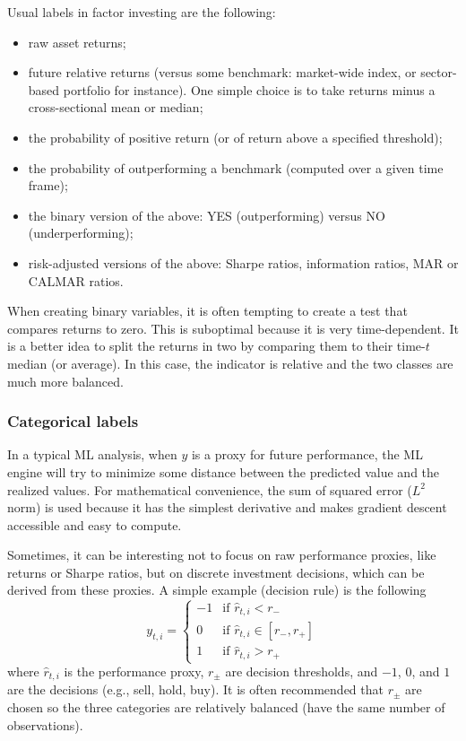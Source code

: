 Usual labels in factor investing are the following:
\begin{itemize}
    \item raw asset returns;
    \item future relative returns (versus some benchmark: market-wide index, or sector-based portfolio for instance). One simple choice is to take returns minus a cross-sectional mean or median;
    \item the probability of positive return (or of return above a specified threshold);
    \item the probability of outperforming a benchmark (computed over a given time frame);
    \item the binary version of the above: YES (outperforming) versus NO (underperforming);
    \item risk-adjusted versions of the above: Sharpe ratios, information ratios, MAR or CALMAR ratios.
\end{itemize}

When creating binary variables, it is often tempting to create a test that compares returns to zero. This is suboptimal because it is very time-dependent. It is a better idea to split the returns in two by comparing them to their time-$t$ median (or average). In this case, the indicator is relative and the two classes are much more balanced.



\subsubsection{Categorical labels}
In a typical ML analysis, when $y$ is a proxy for future performance, the ML engine will try to minimize some distance between the predicted value and the realized values. For mathematical convenience, the sum of squared error ($L^{2}$ norm) is used because it has the simplest derivative and makes gradient descent accessible and easy to compute.

Sometimes, it can be interesting not to focus on raw performance proxies, like returns or Sharpe ratios, but on discrete investment decisions, which can be derived from these proxies. A simple example (decision rule) is the following
\begin{equation}
    y_{t,i} = \begin{cases}
    -1 & \text{if } \hat{r}_{t,i} < r_{-} \\
    0 & \text{if } \hat{r}_{t,i} \in [r_{-}, r_{+}] \\
    1 & \text{if } \hat{r}_{t,i} > r_{+}
    \end{cases}
\end{equation}
where $\hat{r}_{t,i}$ is the performance proxy, $r_{\pm}$ are decision thresholds, and $-1$, $0$, and $1$ are the decisions (e.g., sell, hold, buy). It is often recommended that $r_{\pm}$ are chosen so the three categories are relatively balanced (have the same number of observations).

